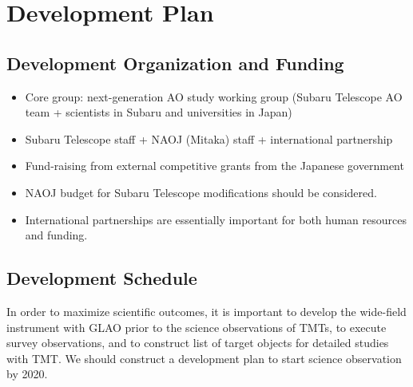 \bigskip



\section{Development Plan}


\subsection{Development Organization and Funding}

\begin{itemize}
 \setlength{\itemsep}{-3pt}
 \item Core group: next-generation AO study working group (Subaru
       Telescope AO team + scientists in Subaru and universities in
       Japan)
 \item Subaru Telescope staff + NAOJ (Mitaka) staff + international
       partnership
 \item Fund-raising from external competitive grants from the Japanese 
       government 
 \item NAOJ budget for Subaru Telescope modifications should be
       considered. 
 \item International partnerships are essentially important for both
       human resources and funding.
\end{itemize}

\subsection{Development Schedule}

In order to maximize scientific outcomes, it is important to develop
the wide-field instrument with GLAO prior to the science observations of
TMTs, to execute survey observations, and to construct list of target
objects for detailed studies with TMT. We should construct a development
plan to start science observation by 2020.
